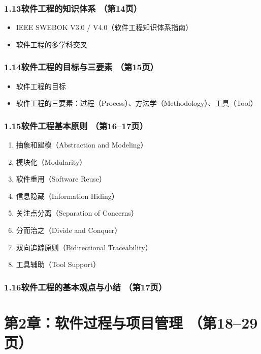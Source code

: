 \documentclass[12pt,a4paper]{ctexart}
\begin{document}
\subsubsection{1.13\quad 软件工程的知识体系 \hfill（第14页）}
\begin{itemize}
    \item IEEE SWEBOK V3.0 / V4.0（软件工程知识体系指南）
    \item 软件工程的多学科交叉
\end{itemize}

\subsubsection{1.14\quad 软件工程的目标与三要素 \hfill（第15页）}
\begin{itemize}
    \item 软件工程的目标
    \item 软件工程的三要素：过程（Process）、方法学（Methodology）、工具（Tool）
\end{itemize}

\subsubsection{1.15\quad 软件工程基本原则 \hfill（第16--17页）}
\begin{enumerate}
    \item 抽象和建模（Abstraction and Modeling）
    \item 模块化（Modularity）
    \item 软件重用（Software Reuse）
    \item 信息隐藏（Information Hiding）
    \item 关注点分离（Separation of Concerns）
    \item 分而治之（Divide and Conquer）
    \item 双向追踪原则（Bidirectional Traceability）
    \item 工具辅助（Tool Support）
\end{enumerate}

\subsubsection{1.16\quad 软件工程的基本观点与小结 \hfill（第17页）}

\vspace{0.3cm}
\section{第2章：软件过程与项目管理 \hfill（第18--29页）}
\end{document}
